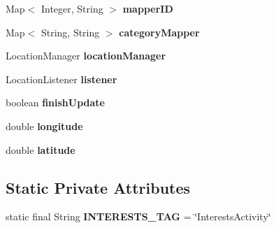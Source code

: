 \begin{DoxyCompactItemize}
\item 
Map$<$ Integer, String $>$ {\bfseries mapper\+ID}\hypertarget{classcom_1_1example_1_1sebastian_1_1tindertp_1_1InterestsActivity_ab09e12a59b5fbc15519fae2585ba695d}{}\label{classcom_1_1example_1_1sebastian_1_1tindertp_1_1InterestsActivity_ab09e12a59b5fbc15519fae2585ba695d}

\item 
Map$<$ String, String $>$ {\bfseries category\+Mapper}\hypertarget{classcom_1_1example_1_1sebastian_1_1tindertp_1_1InterestsActivity_a2fbfbf64a57531753fbe32454f94caa0}{}\label{classcom_1_1example_1_1sebastian_1_1tindertp_1_1InterestsActivity_a2fbfbf64a57531753fbe32454f94caa0}

\item 
Location\+Manager {\bfseries location\+Manager}\hypertarget{classcom_1_1example_1_1sebastian_1_1tindertp_1_1InterestsActivity_a55723791b1c0ff5cefdbed79b9f89af4}{}\label{classcom_1_1example_1_1sebastian_1_1tindertp_1_1InterestsActivity_a55723791b1c0ff5cefdbed79b9f89af4}

\item 
Location\+Listener {\bfseries listener}\hypertarget{classcom_1_1example_1_1sebastian_1_1tindertp_1_1InterestsActivity_af3186c82415a1803935baffa8c89786c}{}\label{classcom_1_1example_1_1sebastian_1_1tindertp_1_1InterestsActivity_af3186c82415a1803935baffa8c89786c}

\item 
boolean {\bfseries finish\+Update}\hypertarget{classcom_1_1example_1_1sebastian_1_1tindertp_1_1InterestsActivity_ac79dfacc55553027c9d1422082512cab}{}\label{classcom_1_1example_1_1sebastian_1_1tindertp_1_1InterestsActivity_ac79dfacc55553027c9d1422082512cab}

\item 
double {\bfseries longitude}\hypertarget{classcom_1_1example_1_1sebastian_1_1tindertp_1_1InterestsActivity_a79a35c7872b9b474e14022978fb105f3}{}\label{classcom_1_1example_1_1sebastian_1_1tindertp_1_1InterestsActivity_a79a35c7872b9b474e14022978fb105f3}

\item 
double {\bfseries latitude}\hypertarget{classcom_1_1example_1_1sebastian_1_1tindertp_1_1InterestsActivity_af743f5618fd4c4a73212d74cff3f5dff}{}\label{classcom_1_1example_1_1sebastian_1_1tindertp_1_1InterestsActivity_af743f5618fd4c4a73212d74cff3f5dff}

\end{DoxyCompactItemize}
\subsection*{Static Private Attributes}
\begin{DoxyCompactItemize}
\item 
static final String {\bfseries I\+N\+T\+E\+R\+E\+S\+T\+S\+\_\+\+T\+AG} = \char`\"{}Interests\+Activity\char`\"{}\hypertarget{classcom_1_1example_1_1sebastian_1_1tindertp_1_1InterestsActivity_ade01d74dbc52e68e6da3bb35fe972bd6}{}\label{classcom_1_1example_1_1sebastian_1_1tindertp_1_1InterestsActivity_ade01d74dbc52e68e6da3bb35fe972bd6}

\end{DoxyCompactItemize}


